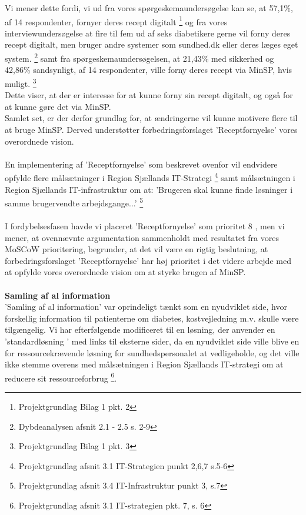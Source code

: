 Vi mener dette fordi, vi ud fra vores spørgeskemaundersøgelse kan se, at 57,1\%, af 14 respondenter, fornyer deres recept digitalt \footnote{Projektgrundlag Bilag 1 pkt. 2} og fra vores interviewundersøgelse at fire til fem ud af seks diabetikere gerne vil forny deres recept digitalt, men bruger andre systemer som sundhed.dk eller deres læges eget system. \footnote{Dybdeanalysen afsnit 2.1 - 2.5 s. 2-9} samt fra spørgeskemaundersøgelsen, at 21,43\% med sikkerhed og 42,86\% sandsynligt, af 14 respondenter, ville forny deres recept via MinSP, hvis muligt. \footnote{Projektgrundlag Bilag 1 pkt. 3}  \\
Dette viser, at der er interesse for at kunne forny sin recept digitalt, og også for at kunne gøre det via MinSP.\\
Samlet set, er der derfor grundlag for, at ændringerne vil kunne motivere flere til at bruge MinSP. Derved understøtter forbedringsforslaget 'Receptfornyelse' vores overordnede vision.\\
\\
En implementering af 'Receptfornyelse' som beskrevet ovenfor vil endvidere opfylde flere målsætninger i Region Sjællands IT-Strategi \footnote{Projektgrundlag afsnit 3.1 IT-Strategien punkt 2,6,7 s.5-6} samt målsætningen i Region Sjællands IT-infrastruktur om at: 'Brugeren skal kunne finde løsninger i samme brugervendte arbejdsgange...' \footnote{Projektgrundlag afsnit 3.4 IT-Infrastruktur punkt 3, s.7}\\
\\
I fordybelsesfasen havde vi placeret 'Receptfornyelse' som prioritet 8%
, men vi mener, at ovennævnte argumentation sammenholdt med resultatet fra vores MoSCoW prioritering, begrunder, at det vil være en rigtig beslutning, at %
forbedringsforslaget 'Receptfornyelse' har høj prioritet i det videre arbejde med at opfylde vores overordnede vision om at styrke brugen af MinSP.\\\\
\textbf{Samling af al information}\\
'Samling af al information' var oprindeligt tænkt som en nyudviklet side, hvor forskellig information til patienterne om diabetes, kostvejledning m.v. skulle være tilgængelig. Vi har efterfølgende modificeret til en løsning, der anvender en ’standardløsning ’ med links til eksterne sider, da en nyudviklet side ville blive en for ressourcekrævende løsning for sundhedspersonalet at vedligeholde, og det ville ikke stemme overens med målsætningen i Region Sjællands IT-strategi om at reducere sit ressourceforbrug \footnote{Projektgrundlag afsnit 3.1 IT-strategien pkt. 7, s. 6}.\\
